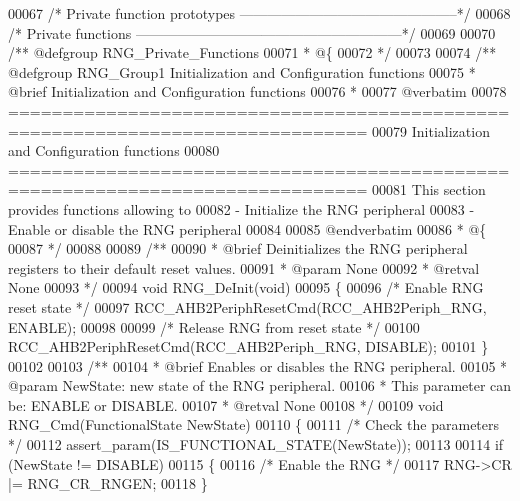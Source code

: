 \begin{DoxyCode}
00067 \textcolor{comment}{/* Private function prototypes -----------------------------------------------*/}
00068 \textcolor{comment}{/* Private functions ---------------------------------------------------------*/}
00069 
00070 \textcolor{comment}{/** @defgroup RNG\_Private\_Functions}
00071 \textcolor{comment}{  * @\{}
00072 \textcolor{comment}{  */}
00073 
00074 \textcolor{comment}{/** @defgroup RNG\_Group1 Initialization and Configuration functions}
00075 \textcolor{comment}{ *  @brief    Initialization and Configuration functions }
00076 \textcolor{comment}{ *}
00077 \textcolor{comment}{@verbatim    }
00078 \textcolor{comment}{ ===============================================================================}
00079 \textcolor{comment}{                      Initialization and Configuration functions}
00080 \textcolor{comment}{ ===============================================================================  }
00081 \textcolor{comment}{  This section provides functions allowing to }
00082 \textcolor{comment}{   - Initialize the RNG peripheral}
00083 \textcolor{comment}{   - Enable or disable the RNG peripheral}
00084 \textcolor{comment}{   }
00085 \textcolor{comment}{@endverbatim}
00086 \textcolor{comment}{  * @\{}
00087 \textcolor{comment}{  */}
00088 
00089 \textcolor{comment}{/**}
00090 \textcolor{comment}{  * @brief  Deinitializes the RNG peripheral registers to their default reset values.}
00091 \textcolor{comment}{  * @param  None}
00092 \textcolor{comment}{  * @retval None}
00093 \textcolor{comment}{  */}
00094 \textcolor{keywordtype}{void} RNG_DeInit(\textcolor{keywordtype}{void})
00095 \{
00096   \textcolor{comment}{/* Enable RNG reset state */}
00097   RCC_AHB2PeriphResetCmd(RCC_AHB2Periph_RNG, ENABLE);
00098 
00099   \textcolor{comment}{/* Release RNG from reset state */}
00100   RCC_AHB2PeriphResetCmd(RCC_AHB2Periph_RNG, DISABLE);
00101 \}
00102 
00103 \textcolor{comment}{/**}
00104 \textcolor{comment}{  * @brief  Enables or disables the RNG peripheral.}
00105 \textcolor{comment}{  * @param  NewState: new state of the RNG peripheral.}
00106 \textcolor{comment}{  *          This parameter can be: ENABLE or DISABLE.}
00107 \textcolor{comment}{  * @retval None}
00108 \textcolor{comment}{  */}
00109 \textcolor{keywordtype}{void} RNG_Cmd(FunctionalState NewState)
00110 \{
00111   \textcolor{comment}{/* Check the parameters */}
00112   assert_param(IS\_FUNCTIONAL\_STATE(NewState));
00113 
00114   \textcolor{keywordflow}{if} (NewState != DISABLE)
00115   \{
00116     \textcolor{comment}{/* Enable the RNG */}
00117     RNG->CR |= RNG_CR_RNGEN;
00118   \}

\end{DoxyCode}
